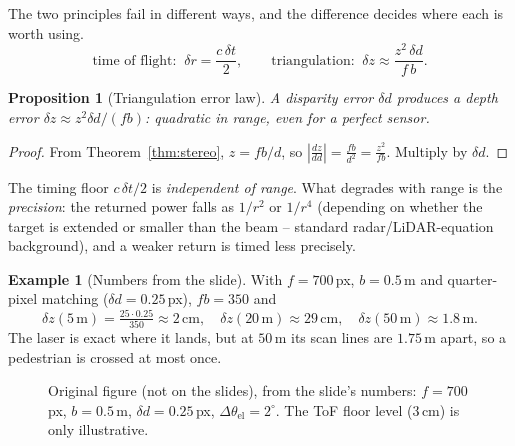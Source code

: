 \documentclass[11pt,a4paper]{article}
\theoremstyle{definition}
\newtheorem{example}[definition]{Example}
\theoremstyle{plain}
\newtheorem{proposition}[definition]{Proposition}
\theoremstyle{remark}
\begin{document}
The two principles fail in different ways, and the difference decides where each is worth using.
\[
\text{time of flight: }\ \delta r=\frac{c\,\delta t}{2},
\qquad
\text{triangulation: }\ \delta z\approx\frac{z^{2}\,\delta d}{f\,b}.
\]
 
\begin{proposition}[Triangulation error law]\label{prop:errlaw}
A disparity error $\delta d$ produces a depth error $\delta z\approx z^2\delta d/(fb)$: quadratic in range, even for a perfect sensor.
\end{proposition}
\begin{proof}
From Theorem~\ref{thm:stereo}, $z=fb/d$, so $\left|\frac{dz}{dd}\right|=\frac{fb}{d^2}=\frac{z^2}{fb}$. Multiply by $\delta d$. \qedhere
\end{proof}
 
The timing floor $c\,\delta t/2$ is \emph{independent of range}. What degrades with range is the \emph{precision}: the returned power falls as $1/r^2$ or $1/r^4$ (depending on whether the target is extended or smaller than the beam -- standard radar/LiDAR-equation background), and a weaker return is timed less precisely.
 
\begin{example}[Numbers from the slide]
With $f=700$\,px, $b=0.5$\,m and quarter-pixel matching ($\delta d=0.25$\,px), $fb=350$ and
\[
\delta z(5\,\text{m})=\tfrac{25\cdot0.25}{350}\approx 2\,\text{cm},\quad
\delta z(20\,\text{m})\approx 29\,\text{cm},\quad
\delta z(50\,\text{m})\approx 1.8\,\text{m}.
\]
The laser is exact where it lands, but at $50$\,m its scan lines are $1.75$\,m apart, so a pedestrian is crossed at most once.
\end{example}
 
\begin{figure}[htbp]
\centering
{}
\caption{Original figure (not on the slides), from the slide's numbers: $f=700$\,px, $b=0.5$\,m, $\delta d=0.25$\,px, $\Delta\theta_{\text{el}}=2^\circ$. The ToF floor level ($3$\,cm) is only illustrative.}
\end{figure}
 
\end{document}
